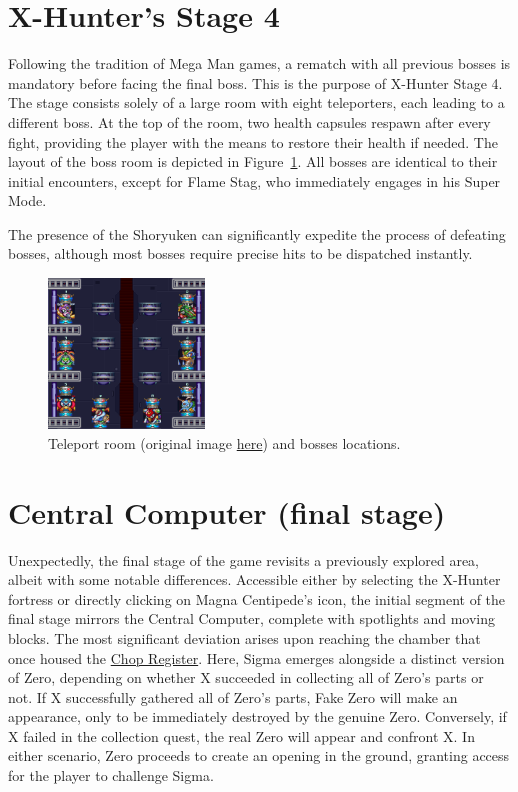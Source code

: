 \section{X-Hunter's Stage 4}
Following the tradition of Mega Man games, a rematch with all previous bosses is mandatory before facing the final boss. This is the purpose of X-Hunter Stage 4. The stage consists solely of a large room with eight teleporters, each leading to a different boss. At the top of the room, two health capsules respawn after every fight, providing the player with the means to restore their health if needed. The layout of the boss room is depicted in Figure~\ref{fig:teleport_room}. All bosses are identical to their initial encounters, except for Flame Stag, who immediately engages in his Super Mode.

The presence of the Shoryuken can significantly expedite the process of defeating bosses, although most bosses require precise hits to be dispatched instantly.

\begin{figure}[htp]
	\centering
	\includegraphics[height=4cm]{figures/X2/Hunter_stages/map-4.png}
	\caption[Teleport room and boss location]{Teleport room (original image \href{https://vgmaps.com/Atlas/SuperNES/MegaManX2-X-HunterBase-Stage4.png}{here}) and bosses locations.}
	\label{fig:teleport_room}
\end{figure}

\section{Central Computer (final stage)}

Unexpectedly, the final stage of the game revisits a previously explored area, albeit with some notable differences. Accessible either by selecting the X-Hunter fortress or directly clicking on Magna Centipede's icon, the initial segment of the final stage mirrors the Central Computer, complete with spotlights and moving blocks. The most significant deviation arises upon reaching the chamber that once housed the \hyperlink{miniboss:Chop_Register}{Chop Register}. Here, Sigma emerges alongside a distinct version of Zero, depending on whether X succeeded in collecting all of Zero's parts or not. If X successfully gathered all of Zero's parts, Fake Zero will make an appearance, only to be immediately destroyed by the genuine Zero. Conversely, if X failed in the collection quest, the real Zero will appear and confront X. In either scenario, Zero proceeds to create an opening in the ground, granting access for the player to challenge Sigma. 

